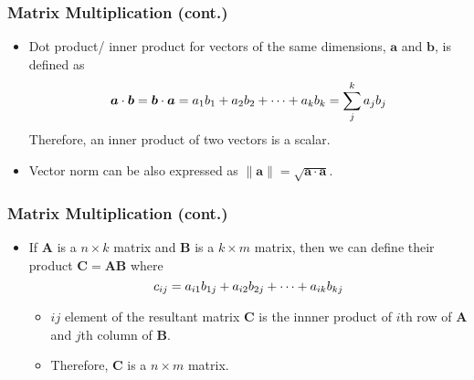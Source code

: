 \documentclass[pdflatex, 12pt]{beamer}
\begin{document}
\begin{frame}
\frametitle{Matrix Multiplication (cont.)}
\begin{itemize}
\item {\color{red} Dot product}/{\color{red} inner product} for vectors of the same dimensions, $\bm{a}$ and $\bm{b}$, is defined as 
\begin{equation}
 \bm{a} \cdot \bm{b} = \bm{b} \cdot \bm{a} = a_{1}b_{1} + a_{2}b_{2} + \cdots + a_{k}b_{k} = \sum_j^k a_{j}b_{j} \notag 
 \end{equation}
Therefore, an inner product of two vectors is a scalar.
\vspace{0.4cm}
\item Vector norm can be also expressed as $\|\bm{a}\| = \sqrt{\bm{a} \cdot \bm{a}}$.  
\end{itemize}
\end{frame}

\begin{frame}
\frametitle{Matrix Multiplication (cont.)}
\begin{itemize}
\item If $\bm{A}$ is a $n \times k$ matrix and $\bm{B}$ is a $k \times m$ matrix, then we can define their product $\bm{C} = \bm{AB}$ where
 \begin{equation}
 c_{ij} = a_{i1}b_{1j} + a_{i2}b_{2j} + \cdots + a_{ik}b_{kj} \notag
 \end{equation}
 \begin{itemize}
 \item $ij$ element of the resultant matrix $\bm{C}$ is the innner product of $i$th row of $\bm{A}$ and $j$th column of $\bm{B}$.
 \item Therefore, $\bm{C}$ is a $n \times m$ matrix.
 \end{itemize}
\end{itemize}
\end{frame}
\end{document}
